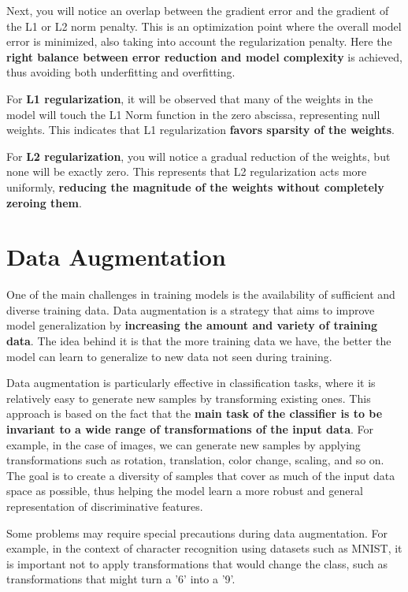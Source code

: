 Next, you will notice an overlap between the gradient error and the gradient of the L1 or L2 norm penalty. This is an optimization point where the overall model error is minimized, also taking into account the regularization penalty. Here the \textbf{right balance between error reduction and model complexity} is achieved, thus avoiding both underfitting and overfitting.

For \textbf{\textcolor{mygreen}{L1 regularization}}, it will be observed that many of the weights in the model will touch the L1 Norm function in the zero abscissa, representing null weights. This indicates that L1 regularization \textbf{favors sparsity of the weights}.

For \textbf{\textcolor{myred}{L2 regularization}}, you will notice a gradual reduction of the weights, but none will be exactly zero. This represents that L2 regularization acts more uniformly, \textbf{reducing the magnitude of the weights without completely zeroing them}.

\section{Data Augmentation}

One of the main challenges in training models is the availability of sufficient and diverse training data. Data augmentation is a strategy that aims to improve model generalization by \textbf{increasing the amount and variety of training data}. The idea behind it is that the more training data we have, the better the model can learn to generalize to new data not seen during training.

Data augmentation is particularly effective in classification tasks, where it is relatively easy to generate new samples by transforming existing ones. This approach is based on the fact that the \textbf{main task of the classifier is to be invariant to a wide range of transformations of the input data}. For example, in the case of images, we can generate new samples by applying transformations such as rotation, translation, color change, scaling, and so on. The goal is to create a diversity of samples that cover as much of the input data space as possible, thus helping the model learn a more robust and general representation of discriminative features.
    
Some problems may require special precautions during data augmentation. For example, in the context of character recognition using datasets such as MNIST, it is important not to apply transformations that would change the class, such as transformations that might turn a '6' into a '9'.
    
